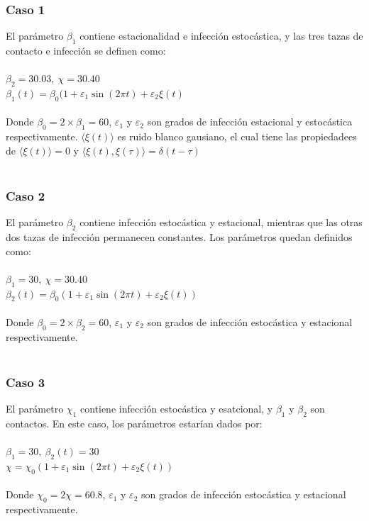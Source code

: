 \documentclass[conference]{IEEEtran}
\begin{document}
\subsubsection{Caso 1}

El parámetro $\beta_1$ contiene estacionalidad e infección estocástica, y las tres tazas de contacto e infección se definen como:
\\\\
$\beta_2 = 30.03, \ \chi = 30.40$
\\
$\beta_1(t) = \beta_0(1 + \varepsilon_1 \sin(2\pi t) + \varepsilon_2 \xi(t)$
\\\\
Donde $\beta_0 = 2 \times \beta_1 = 60$, $\varepsilon_1$ y $\varepsilon_2$ son grados de infección 
estacional y estocástica respectivamente. $\langle \xi(t) \rangle$ es ruido blanco gausiano, 
el cual tiene las propiedadees de $\langle \xi(t) \rangle = 0$ y $\langle \xi(t), \xi(\tau) \rangle = \delta(t - \tau)$
\\\\
\subsubsection{Caso 2}

El parámetro $\beta_2$ contiene infección estocástica y estacional, mientras que las otras dos tazas de infección permanecen constantes. Los parámetros quedan definidos como:
\\\\
$\beta_1 = 30, \ \chi = 30.40$
\\
$\beta_2(t) = \beta_0(1+\varepsilon_1 \sin(2 \pi t) + \varepsilon_2 \xi(t))$
\\\\
Donde $\beta_0 = 2 \times \beta_2 = 60$, $\varepsilon_1$ y $\varepsilon_2$ son grados de infección estocástica y estacional respectivamente.
\\\\
\subsubsection{Caso 3}

El parámetro $\chi_1$ contiene infección estocástica y esatcional, y $\beta_1$ y $\beta_2$ son contactos. En este caso, los parámetros estarían dados por:
\\\\
$\beta_1 = 30, \ \beta_2(t) = 30$
\\
$\chi = \chi_0(1 + \varepsilon_1 \sin(2 \pi t) + \varepsilon_2 \xi(t))$
\\\\
Donde $\chi_0 = 2\chi = 60.8$, $\varepsilon_1$ y $\varepsilon_2$ son grados de infección estocástica y estacional respectivamente.
\\\\
\end{document}
